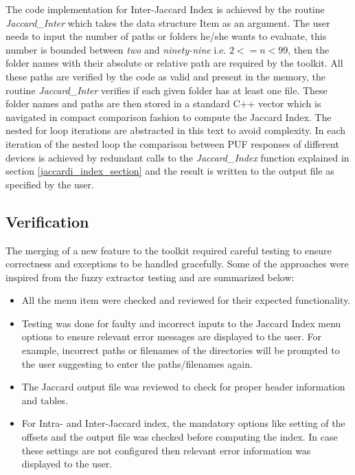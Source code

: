 The code implementation for Inter-Jaccard Index is achieved by the routine \emph{Jaccard\_Inter} which takes the data structure Item as an argument. The user needs to input the number of paths or folders he/she wants to evaluate, this number is bounded between \emph{two} and \emph{ninety-nine} i.e. $2 <= n < 99$, then the folder names with their absolute or relative path are required by the toolkit. All these paths are verified by the code as valid and present in the memory, the
routine \emph{Jaccard\_Inter} verifies if each given folder has at least one file. These folder names and paths are then stored in a standard C++ vector which is navigated in compact comparison fashion to compute the Jaccard Index. The nested for loop iterations are abstracted in this text to avoid complexity. In each iteration of the nested loop the comparison between PUF responses of different devices is achieved by redundant calls to the \emph{Jaccard\_Index} function explained in section
\ref{jaccardi_index_section} and the result is written to the output file as specified by the user.\\

\subsection{Verification}
The merging of a new feature to the toolkit required careful testing to ensure correctness and exceptions to be handled gracefully. Some of the approaches were inspired from the fuzzy extractor testing and are summarized below:
\begin{itemize}
	\item All the menu item were checked and reviewed for their expected functionality.
	\item Testing was done for faulty and incorrect inputs to the Jaccard Index menu options to ensure relevant error messages are displayed to the user. For example, incorrect paths or filenames of the directories will be prompted to the user suggesting to enter the paths/filenames again.
	\item The Jaccard output file was reviewed to check for proper header information and tables.
	\item For Intra- and Inter-Jaccard index, the mandatory options like setting of the offsets and the output file was checked before computing the index. In case these settings are not configured then relevant error information was displayed to the user.
\end{itemize}

